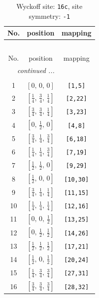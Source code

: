 \documentclass[fleqn,8pt]{jsarticle}
\begin{document}
\begin{longtable}{ccc}
\caption{Wyckoff site: {\tt 16c}, site symmetry: {\tt -1}}
 \\
 \hline \hline
No. & position & mapping \\ \hline \endfirsthead

\multicolumn{2}{l}{\tablename\ \thetable{}} \\
 \hline \hline
No. & position & mapping \\ \hline \endhead

 \hline \hline
\multicolumn{2}{r}{\footnotesize\it continued ...} \\ \endfoot

 \hline \hline
\multicolumn{2}{r}{} \\ \endlastfoot

1 & $\left[ 0,\, 0,\, 0 \right]$ & {\tt [1,5]} \\ \hline
2 & $\left[ \frac{1}{4},\, \frac{3}{4},\, \frac{1}{4} \right]$ & {\tt [2,22]} \\ \hline
3 & $\left[ \frac{3}{4},\, \frac{3}{4},\, \frac{1}{4} \right]$ & {\tt [3,23]} \\ \hline
4 & $\left[ 0,\, \frac{1}{2},\, 0 \right]$ & {\tt [4,8]} \\ \hline
5 & $\left[ \frac{3}{4},\, \frac{1}{4},\, \frac{3}{4} \right]$ & {\tt [6,18]} \\ \hline
6 & $\left[ \frac{1}{4},\, \frac{1}{4},\, \frac{3}{4} \right]$ & {\tt [7,19]} \\ \hline
7 & $\left[ \frac{1}{2},\, \frac{1}{2},\, 0 \right]$ & {\tt [9,29]} \\ \hline
8 & $\left[ \frac{1}{2},\, 0,\, 0 \right]$ & {\tt [10,30]} \\ \hline
9 & $\left[ \frac{3}{4},\, \frac{1}{4},\, \frac{1}{4} \right]$ & {\tt [11,15]} \\ \hline
10 & $\left[ \frac{1}{4},\, \frac{1}{4},\, \frac{1}{4} \right]$ & {\tt [12,16]} \\ \hline
11 & $\left[ 0,\, 0,\, \frac{1}{2} \right]$ & {\tt [13,25]} \\ \hline
12 & $\left[ 0,\, \frac{1}{2},\, \frac{1}{2} \right]$ & {\tt [14,26]} \\ \hline
13 & $\left[ \frac{1}{2},\, \frac{1}{2},\, \frac{1}{2} \right]$ & {\tt [17,21]} \\ \hline
14 & $\left[ \frac{1}{2},\, 0,\, \frac{1}{2} \right]$ & {\tt [20,24]} \\ \hline
15 & $\left[ \frac{1}{4},\, \frac{3}{4},\, \frac{3}{4} \right]$ & {\tt [27,31]} \\ \hline
16 & $\left[ \frac{3}{4},\, \frac{3}{4},\, \frac{3}{4} \right]$ & {\tt [28,32]} \\
\end{longtable}
\end{document}
